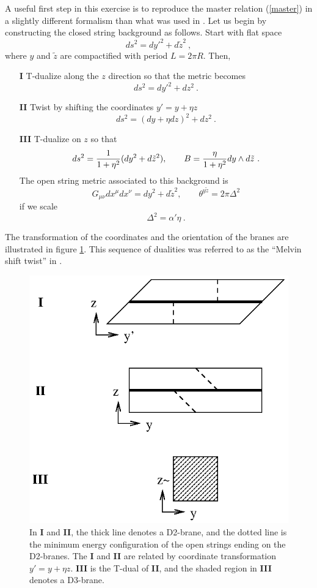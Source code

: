 \documentclass[12pt]{article}
\newcommand{\be}{\begin{equation}}
\newcommand{\ee}{\end{equation}}
\begin{document}
A useful first step in this exercise is to reproduce the master
relation (\ref{master}) in a slightly different formalism than what
was used in \cite{Seiberg:1999vs}.  Let us begin by constructing the
closed string background as follows. Start with flat space
%
\be ds^2 = dy'^2 + d\tilde z^2 \ ,  \ee
%
where $y$ and $\tilde z$ are compactified with period $L = 2 \pi R$. Then,
%
\begin{enumerate}
\item[{\bf I}]
T-dualize along the $z$ direction so that the metric becomes 
%
\be ds^2 = dy'^2 + d z^2 \ .  \ee
%
%
\item[{\bf II}] Twist by shifting the coordinates $y' = y + \eta z$
%
\be ds^2 = (dy+ \eta dz)^2 + d z^2 \ . \ee
%
\item[{\bf III}] T-dualize on $z$ so that
%
\be ds^2 = {1 \over 1 + \eta^2}(dy^2 + d \tilde z^2), \qquad B = {\eta \over 1 + \eta^2} dy \wedge d \tilde z \ . \ee
%
The open string metric associated to this background is
%
\be G_{\mu \nu} dx^\mu dx^\nu = dy^2 + d \tilde z^2, \qquad \theta^{y \tilde z} = 2 \pi \Delta^2 \ee
%
if we scale
%
\be \Delta^2 = \alpha' \eta \ . \ee
%
\end{enumerate}
%
The transformation of the coordinates and the orientation of the branes are illustrated in figure \ref{figa}.  This sequence of dualities was referred to as the ``Melvin shift twist'' in \cite{Hashimoto:2004pb}.

\begin{figure}
\centerline{\includegraphics{coordinates}}
\caption{In {\bf I} and {\bf II}, the thick line denotes a D2-brane,
and the dotted line is the minimum energy configuration of the open
strings ending on the D2-branes.  The {\bf I} and {\bf II} are related
by coordinate transformation $y' = y + \eta z$.  {\bf III} is the
T-dual of {\bf II}, and the shaded region in {\bf III} denotes a
D3-brane.\label{figa}}
\end{figure}
\end{document}
